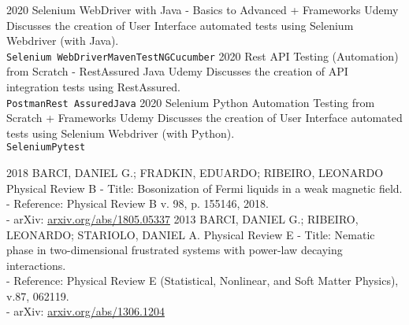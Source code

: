 \documentclass[9pt]{developercv} %
\begin{document}
\begin{entrylist}
		{2020}%
		{Selenium WebDriver with Java - Basics to Advanced + Frameworks}
		{Udemy}
		{Discusses the creation of User Interface automated tests using Selenium Webdriver (with Java).\\ 
		\texttt{Selenium WebDriver}\slashsep\texttt{Maven}\slashsep\texttt{TestNG}\slashsep\texttt{Cucumber}}
	\entry
		{2020}%
		{Rest API Testing (Automation) from Scratch - RestAssured Java}
		{Udemy}
		{Discusses the creation of API integration tests using RestAssured.\\
		\texttt{Postman}\slashsep\texttt{Rest Assured}\slashsep\texttt{Java}}
	\entry
		{2020}%
		{Selenium Python Automation Testing from Scratch + Frameworks}
		{Udemy}
		{Discusses the creation of User Interface automated tests using Selenium Webdriver (with Python).\\ 
		\texttt{Selenium}\slashsep\texttt{Pytest}}
\end{entrylist}



\newpage
{}

\begin{entrylist}
	\entry
	{2018}
	{BARCI, DANIEL G.; FRADKIN, EDUARDO; RIBEIRO, LEONARDO}
	{Physical Review B}
	{- Title: Bosonization of Fermi liquids in a weak magnetic field.\\
	- Reference: Physical Review B v. 98, p. 155146, 2018.\\
	- arXiv: \href{https://arxiv.org/abs/1805.05337}{arxiv.org/abs/1805.05337} }
	\entry
	{2013}
	{BARCI, DANIEL G.; RIBEIRO, LEONARDO; STARIOLO, DANIEL A.}
	{Physical Review E}
	{- Title: Nematic phase in two-dimensional frustrated systems with power-law decaying interactions.\\
	- Reference: Physical Review E (Statistical, Nonlinear, and Soft Matter Physics), v.87, 062119.\\
	- arXiv: \href{http://arxiv.org/abs/1306.1204}{arxiv.org/abs/1306.1204} }
\end{entrylist}

\end{document}
